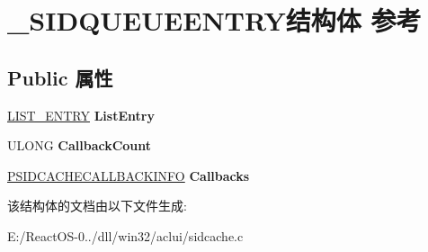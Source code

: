\hypertarget{struct___s_i_d_q_u_e_u_e_e_n_t_r_y}{}\section{\+\_\+\+S\+I\+D\+Q\+U\+E\+U\+E\+E\+N\+T\+R\+Y结构体 参考}
\label{struct___s_i_d_q_u_e_u_e_e_n_t_r_y}
\subsection*{Public 属性}
\begin{DoxyCompactItemize}
\item 
\mbox{\label{struct___s_i_d_q_u_e_u_e_e_n_t_r_y_a396165cda3439f96180ba08490910160}} 
\hyperlink{struct___l_i_s_t___e_n_t_r_y}{L\+I\+S\+T\+\_\+\+E\+N\+T\+RY} {\bfseries List\+Entry}
\item 
\mbox{\label{struct___s_i_d_q_u_e_u_e_e_n_t_r_y_a6fb0f0e56ce237284cbfb60e5e94723a}} 
U\+L\+O\+NG {\bfseries Callback\+Count}
\item 
\mbox{\label{struct___s_i_d_q_u_e_u_e_e_n_t_r_y_a7023829b74f258d9b155de853216b151}} 
\hyperlink{struct___s_i_d_c_a_c_h_e_c_a_l_l_b_a_c_k_i_n_f_o}{P\+S\+I\+D\+C\+A\+C\+H\+E\+C\+A\+L\+L\+B\+A\+C\+K\+I\+N\+FO} {\bfseries Callbacks}
\end{DoxyCompactItemize}


该结构体的文档由以下文件生成\+:\begin{DoxyCompactItemize}
\item 
E\+:/\+React\+O\+S-\/0../dll/win32/aclui/sidcache.\+c\end{DoxyCompactItemize}
